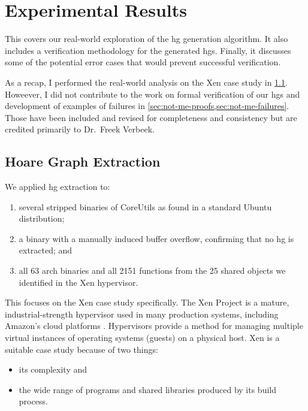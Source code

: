 \chapter{Experimental Results}\label{ch:hg-results}
This  covers our real-world exploration of the \ac{hg} generation algorithm.
It also includes a verification methodology for the generated \acp{hg}.
Finally, it discusses some of the potential error cases that would prevent successful verification.

As a recap, I performed the real-world analysis on the Xen case study in \cref{hg-extraction}.
Howeever, I did not contribute to the work on formal verification of our \acp{hg} and development of examples of failures in \cref{sec:not-me-proofs,sec:not-me-failures}.
Those  have been included and revised for completeness and consistency but are credited primarily to Dr.~Freek Verbeek.

\section{Hoare Graph Extraction}\label{hg-extraction}
We applied \ac{hg} extraction to:
\begin{enumerate}
  \item several stripped binaries of CoreUtils as found in a standard Ubuntu distribution;
  \item a binary with a manually induced buffer overflow, confirming that no \ac{hg} is extracted; and
  \item all 63  \gls{arch} binaries and all 2151 functions from the 25 shared objects we identified in the Xen hypervisor.
\end{enumerate}
This  %
focuses on the Xen case study specifically.
The Xen Project is a mature, industrial-strength hypervisor used in many production systems, including Amazon's cloud platforms \autocite{chisnall2008definitive}.
Hypervisors provide a method for managing multiple virtual instances of operating systems (guests) on a physical host.
Xen is a suitable case study because of two things:
\begin{itemize}
  \item its complexity and
  \item the wide range of programs and shared libraries produced by its build process.
\end{itemize}

